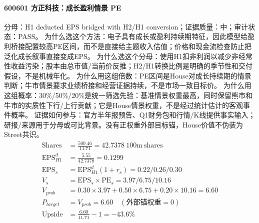 \paragraph{600601 方正科技：成长盈利情景 PE}
分母：H1 deducted EPS bridged with H2/H1 conversion；证据质量：中；审计状态：PASS。
为什么选这个方法：电子具有成长或盈利持续期特征，因此模型给盈利桥接配置较高PE区间，而不是直接给主题收入估值；价格和现金流检查防止把泛化成长叙事直接变成EPS。
为什么选这个分母：使用H1扣非利润以减少非经常性收益污染；股本由总市值/当前价反推；H2/H1转换比例是明确的季节性和交付假设，不是机械年化。
为什么用这组倍数：PE区间是House对成长持续期的情景判断；牛市情景要求业绩桥接和经营证据持续，不是市场一致目标价。
为什么用这组概率：30\%/50\%/20\%是统一筛选先验：基准情景权重最高，同时保留熊市和牛市的实质性下行/上行贡献；它是House情景权重，不是经过统计估计的客观事件概率。
证据如何参与：官方半年报预告、Q1财务包和行情/K线提供事实输入；研报/来源用于分母或可比背景。没有正权重外部目标锚，House价值不伪装为Street共识。
\begin{align*}
\mathrm{Shares} &= \frac{500.46}{11.71}=42.7378\ \mathrm{100m\ shares}\\
\mathrm{EPS}_{H1}^d &= \frac{5.55}{42.7378}=0.1299\\
\mathrm{EPS}_s &= \mathrm{EPS}_{H1}^d(1+r_s)=0.22/0.26/0.30\\
V_s &= \mathrm{EPS}_s\times \mathrm{PE}_s=3.97/6.75/10.16\\
V_{prob} &= 0.30\times 3.97+0.50\times 6.75+0.20\times 10.16=6.60\\
P_{target} &= V_{prob}=6.60\quad(\text{外部锚权重}=0)\\
\mathrm{Upside} &= \frac{6.60}{11.71}-1=-43.6\%\\
\end{align*}

